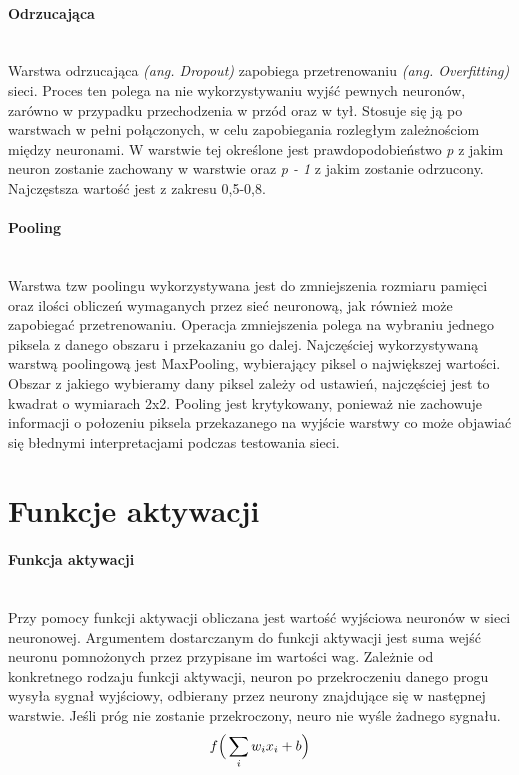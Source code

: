 \paragraph{Odrzucająca}  \mbox{}\\
Warstwa odrzucająca \textit{(ang. Dropout)} zapobiega przetrenowaniu \textit{(ang. Overfitting)}
sieci. Proces ten polega na nie wykorzystywaniu wyjść pewnych neuronów, zarówno
w przypadku przechodzenia w przód oraz w tył. Stosuje się ją po warstwach w pełni
połączonych, w celu zapobiegania rozległym zależnościom między neuronami. W warstwie
tej określone jest prawdopodobieństwo \textit{p} z jakim neuron zostanie zachowany
w warstwie oraz \textit{p - 1} z jakim zostanie odrzucony. Najczęstsza wartość jest
z zakresu 0,5-0,8.

\paragraph{Pooling}  \mbox{}\\
Warstwa tzw poolingu wykorzystywana jest do zmniejszenia rozmiaru pamięci oraz ilości obliczeń
wymaganych przez sieć neuronową, jak również może zapobiegać przetrenowaniu. Operacja zmniejszenia
polega na wybraniu jednego piksela z danego obszaru i przekazaniu go dalej. Najczęściej wykorzystywaną
warstwą poolingową jest MaxPooling, wybierający piksel o największej wartości. Obszar z jakiego
wybieramy dany piksel zależy od ustawień, najczęściej jest to kwadrat o wymiarach 2x2. Pooling
jest krytykowany, ponieważ nie zachowuje informacji o połozeniu piksela przekazanego na wyjście
warstwy co może objawiać się błednymi interpretacjami podczas testowania sieci.

\section{Funkcje aktywacji}
\paragraph{Funkcja aktywacji} \mbox{}\\
Przy pomocy funkcji aktywacji obliczana jest wartość wyjściowa neuronów w sieci
neuronowej. Argumentem dostarczanym do funkcji aktywacji jest suma wejść neuronu
pomnożonych przez przypisane im wartości wag. Zależnie od konkretnego rodzaju funkcji
aktywacji, neuron po przekroczeniu danego progu wysyła sygnał wyjściowy, odbierany
przez neurony znajdujące się w następnej warstwie. Jeśli próg nie zostanie przekroczony,
neuro nie wyśle żadnego sygnału.
\begin{equation}
f\Big(\sum_{i}w_{i}x_{i} + b\Big) \\
\end{equation}

